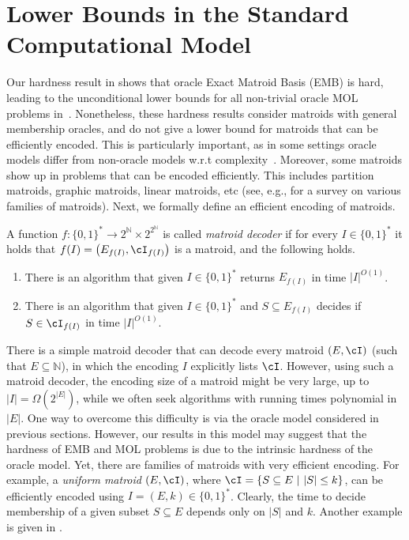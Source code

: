 
\section{Lower Bounds in the Standard Computational Model}
\label{sec:SAT}
Our hardness result in  shows that {\sc oracle Exact Matroid Basis (EMB)} is hard, leading to the unconditional lower bounds for all non-trivial oracle MOL problems in~. Nonetheless, these hardness results consider matroids with general membership oracles, and do not give a lower bound for matroids that can be efficiently encoded. This is particularly important, as in some settings oracle models differ from non-oracle models w.r.t complexity~\cite{canetti2004random,chang1994random}. Moreover, some matroids show up in problems that can be encoded efficiently.
 This includes partition matroids, graphic matroids, linear matroids, etc (see, e.g., \cite{Sc03} for a survey on various families of matroids). Next, we formally define an efficient encoding of matroids.
	
	
	\begin{definition}
		\label{def:encode}
		
		A function $f:\{0,1\}^* \rightarrow 2^{\mathbb{N}} \times 2^{2^{\mathbb{N}}}$ is called {\em matroid decoder} if for every $I \in \{0,1\}^*$ it holds that $f(I) = \left(E_{f(I)}, \cI_{f(I)} \right)$ is a matroid, and the following holds. \begin{enumerate}
			\item There is an algorithm that given $I \in \{0,1\}^*$ returns $E_{f(I)}$ in time $|I|^{O(1)}$.\label{cond:1}
			\item There is an algorithm that given $I \in \{0,1\}^*$ and $S \subseteq E_{f(I)}$ decides if $S \in \cI_{f(I)}$ in time $|I|^{O(1)}$. \label{cond:2}
		\end{enumerate} 
	\end{definition} 
	
	
	
	There is a simple matroid decoder that can decode every matroid $(E,\cI)$ (such that $E\subseteq \mathbb{N}$), in which the encoding $I$ explicitly lists $\cI$. 
	However, using such a matroid decoder, the encoding size of a matroid might be very large, up to $|I|=\Omega\left(2^{|E|}\right)$, while we often seek algorithms with running times polynomial in $|E|$. 
	One way to overcome this difficulty is via the oracle model considered  in previous sections. However, our results in this model may suggest that the hardness of EMB and MOL problems is 	due to the intrinsic hardness of the oracle model.
	 Yet, there are families of matroids with very efficient encoding. For example, a {\em uniform matroid} $(E,\cI)$, where $\cI = \{S \subseteq E~|~|S| \leq k\}$, can be efficiently encoded using $I = (E,k) \in \{0,1\}^*$. Clearly, the time to decide membership of a given subset $S \subseteq E$ depends only on $|S|$ and $k$. Another example is given in . 
	 
